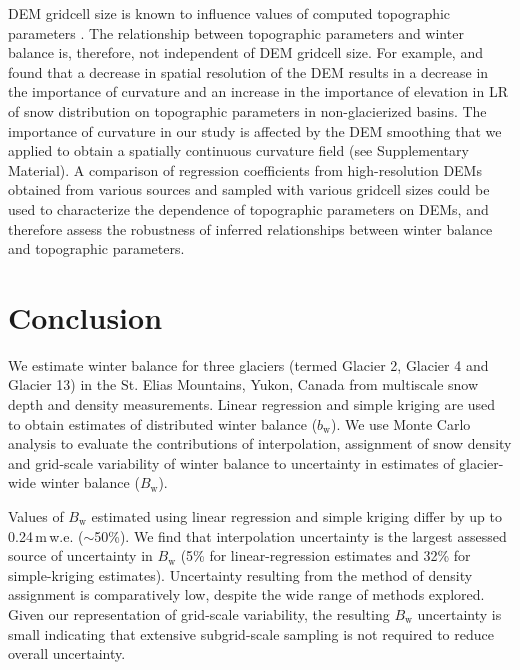 \documentclass[twocolumn, letterpaper]{igs}
\begin{document}
DEM gridcell size is known to influence values of computed topographic parameters \citep{Zhang1994, Garbrecht1994, Guo-an2001, Lopez2010}. The relationship between topographic parameters and winter balance is, therefore, not independent of DEM gridcell size. For example, \cite{Kienzle2004} and \cite{Lopez2010} found that a decrease in spatial resolution of the DEM results in a decrease in the importance of curvature and an increase in the importance of elevation in LR of snow distribution on topographic parameters in non-glacierized basins. The importance of curvature in our study is affected by the DEM smoothing that we applied to obtain a spatially continuous curvature field (see Supplementary Material). A comparison of regression coefficients from high-resolution DEMs obtained from various sources and sampled with various gridcell sizes could be used to characterize the dependence of topographic parameters on DEMs, and therefore assess the robustness of inferred relationships between winter balance and topographic parameters. 


\section{Conclusion}

We estimate winter balance for three glaciers (termed Glacier 2, Glacier 4 and Glacier 13) in the St. Elias Mountains, Yukon, Canada from multiscale snow depth and density measurements. Linear regression and simple kriging are used to obtain estimates of distributed winter balance ($b_\mathrm{w}$). We use Monte Carlo analysis to evaluate the contributions of interpolation, assignment of snow density and grid-scale variability of winter balance to uncertainty in estimates of glacier-wide winter balance ($B_\mathrm{w}$). 

Values of $B_\mathrm{w}$ estimated using linear regression and simple kriging differ by up to 0.24\,m\,w.e. ($\sim$50\%). We find that interpolation uncertainty is the largest assessed source of uncertainty in $B_\mathrm{w}$ (5\% for linear-regression estimates and 32\% for simple-kriging estimates). Uncertainty resulting from the method of density assignment is comparatively low, despite the wide range of methods explored. Given our representation of grid-scale variability, the resulting $B_\mathrm{w}$ uncertainty is small indicating that extensive subgrid-scale sampling is not required to reduce overall uncertainty. 
\end{document}
